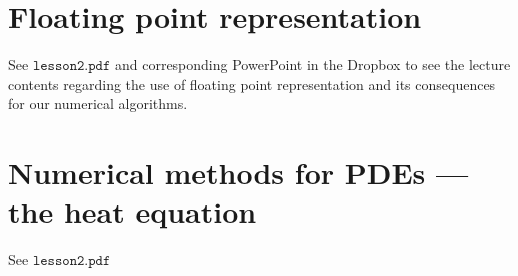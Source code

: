 \documentclass[11pt]{article}
\begin{document}
\section{Floating point representation}
See $\texttt{lesson2.pdf} $ and corresponding PowerPoint in the Dropbox to see the lecture contents regarding the use of floating point representation and its consequences for our numerical algorithms. 

\section{Numerical methods for PDEs --- the heat equation}
See  $\texttt{lesson2.pdf} $
\end{document}
